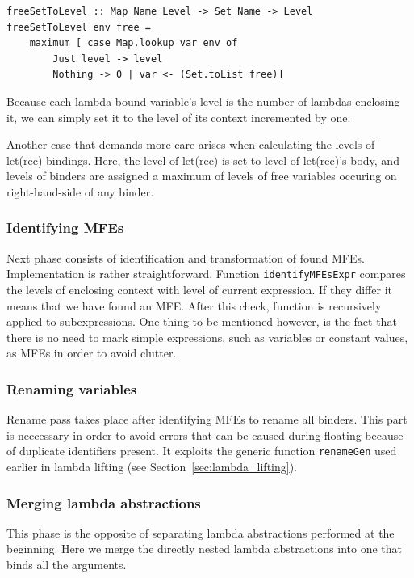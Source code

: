 \documentclass[12pt,a4paper]{report}
\begin{document}
\vspace*{0.2in}
\begin{lstlisting}[style=haskell]
freeSetToLevel :: Map Name Level -> Set Name -> Level
freeSetToLevel env free =
    maximum [ case Map.lookup var env of
        Just level -> level
        Nothing -> 0 | var <- (Set.toList free)]
\end{lstlisting}

Because each lambda-bound variable's level is the number of lambdas enclosing
it, we can simply set it to the level of its context incremented by one.

Another case that demands more care arises when calculating the levels of
let(rec) bindings. Here, the level of let(rec) is set to level of let(rec)'s
body, and levels of binders are assigned a maximum of levels of free variables
occuring on right-hand-side of any binder.

\subsubsection{Identifying MFEs}
Next phase consists of identification and transformation of found MFEs.
Implementation is rather straightforward. Function \texttt{identifyMFEsExpr}
compares the levels of enclosing context with level of current expression. If
they differ it means that we have found an MFE. After this check, function is
recursively applied to subexpressions. One thing to be mentioned however, is
the fact that there is no need to mark simple expressions, such as variables or
constant values, as MFEs in order to avoid clutter.

\subsubsection{Renaming variables}
Rename pass takes place after identifying MFEs to rename all binders. This
part is neccessary in order to avoid errors that can be caused during floating
because of duplicate identifiers present. It exploits the generic function
\texttt{renameGen} used earlier in lambda lifting (see
Section~\ref{sec:lambda_lifting}).

\subsubsection{Merging lambda abstractions}
This phase is the opposite of separating lambda abstractions performed at the
beginning. Here we merge the directly nested lambda abstractions into one that
binds all the arguments.
\end{document}

